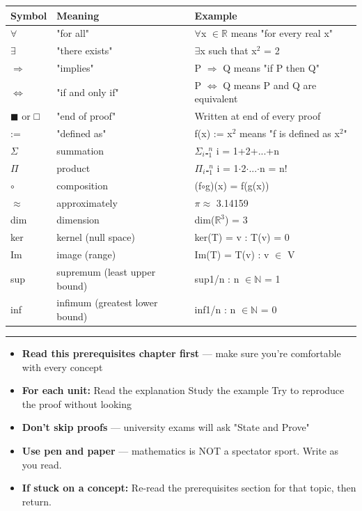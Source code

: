 \documentclass[12pt,a4paper,openany]{book}
\begin{document}
\begin{center}
\begin{tabular}{|l|l|l|}
\hline
\textbf{Symbol} & \textbf{Meaning} & \textbf{Example} \\
\hline
$\forall$ & "for all" & $\forall$x $\in\mathbb{R}$ means "for every real x" \\
\hline
$\exists$ & "there exists" & $\exists$x such that x$^2$ = 2 \\
\hline
$\Longrightarrow$ & "implies" & P $\Longrightarrow$ Q means "if P then Q" \\
\hline
$\Longleftrightarrow$ & "if and only if" & P $\Longleftrightarrow$ Q means P and Q are equivalent \\
\hline
$\blacksquare$ or □ & "end of proof" & Written at end of every proof \\
\hline
:= & "defined as" & f(x) := x$^2$ means "f is defined as x$^2$" \\
\hline
$\Sigma$ & summation & $\Sigma_i$₌$_1^n$ i = 1+2+...+n \\
\hline
$\Pi$ & product & $\Pi_i$₌$_1^n$ i = 1$\cdot$2$\cdot$...$\cdot$n = n! \\
\hline
$\circ$ & composition & (f$\circ$g)(x) = f(g(x)) \\
\hline
$\approx$ & approximately & $\pi\approx$ 3.14159 \\
\hline
dim & dimension & dim($\mathbb{R}^3$) = 3 \\
\hline
ker & kernel (null space) & ker(T) = {v : T(v) = 0} \\
\hline
Im & image (range) & Im(T) = {T(v) : v $\in$ V} \\
\hline
sup & supremum (least upper bound) & sup{1/n : n $\in\mathbb{N}$} = 1 \\
\hline
inf & infimum (greatest lower bound) & inf{1/n : n $\in\mathbb{N}$} = 0 \\
\hline
\end{tabular}
\end{center}

\bigskip\noindent\rule{\textwidth}{0.4pt}\bigskip


\begin{itemize}
  \item \textbf{Read this prerequisites chapter first} — make sure you're comfortable with every concept
  \item \textbf{For each unit:} Read the explanation  Study the example  Try to reproduce the proof without looking
  \item \textbf{Don't skip proofs} — university exams will ask "State and Prove"
  \item \textbf{Use pen and paper} — mathematics is NOT a spectator sport. Write as you read.
  \item \textbf{If stuck on a concept:} Re-read the prerequisites section for that topic, then return.
\end{itemize}
\end{document}
